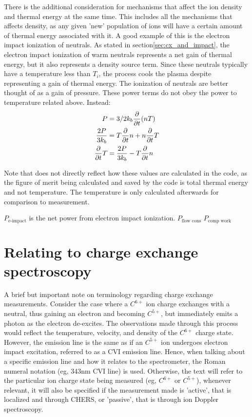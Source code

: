 \begin{refsection}
There is the additional consideration for mechanisms that affect the ion density and thermal energy at the same time. This includes all the mechanisms that affects density, as any given 'new' population of ions will have a certain amount of thermal energy associated with it. A good example of this is the electron impact ionization of neutrals. As stated in section\ref{sec:cx_and_impact}, the electron impact ionization of warm neutrals represents a net gain of thermal energy, but it also represents a density source term. Since these neutrals typically have a temperature less than $T_i$, the process cools the plasma despite representing a gain of thermal energy. The ionization of neutrals are better thought of as a gain of pressure. These power terms do not obey the power to temperature related above. Instead:
\begin{align}
    P &= 3/2k_b \frac{\partial}{\partial t}(n T) \\
    \frac{2P}{3k_b} &= T\frac{\partial}{\partial t} n + n \frac{\partial}{\partial t} T \\
    \frac{\partial}{\partial t} T &= \frac{2P}{3k_b} - T\frac{\partial}{\partial t} n 
\end{align}

Note that does not directly reflect how these values are calculated in the code, as the figure of merit being calculated and saved by the code is total thermal energy and not temperature. The temperature is only calculated afterwards for comparison to measurement. 


$P_{\text{e-impact}}$ is the net power from electron impact ionization.
$P_{\text{flow cons}}$
$P_{\text{comp work}}$


\section{Relating to charge exchange spectroscopy}

A brief but important note on terminology regarding charge exchange measurements. Consider the case where a $C^{6+}$ ion charge exchanges with a neutral, thus gaining an electron and becoming $C^{5+}$, but immediately emits a photon as the electron de-excites. The observations made through this process would reflect the temperature, velocity, and density of the $C^{6+}$ charge state. However, the emission line is the same as if an $C^{5+}$ ion undergoes electron impact excitation, referred to as a CVI emission line. Hence, when talking about a specific emission line and how it relates to the spectrometer, the Roman numeral notation (eg, 343nm CVI line) is used. Otherwise, the text will refer to the particular ion charge state being measured (eg, $C^{6+}$ or $C^{5+}$), whenever relevant, it will also be specified if the measurement made is 'active', that is localized and through CHERS, or 'passive', that is through ion Doppler spectroscopy. 


\end{refsection}
